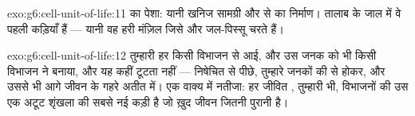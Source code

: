 \begin{solution}{exo:g6:cell-unit-of-life:11}
 का पेशा: यानी खनिज सामग्री और  से  का
 निर्माण। तालाब के जाल में वे पहली कड़ियाँ हैं --- यानी वह हरी
मंज़िल जिसे  और जल-पिस्सू चरते हैं।
\end{solution}

\begin{solution}{exo:g6:cell-unit-of-life:12}
तुम्हारी हर  किसी विभाजन से आई, और उस जनक  को भी किसी
विभाजन ने बनाया, और यह कहीं टूटता नहीं --- निषेचित  से पीछे,
तुम्हारे जनकों की  से होकर, और उससे भी आगे जीवन के गहरे अतीत
में। एक वाक्य में नतीजा: हर जीवित , तुम्हारी भी, विभाजनों की उस
एक अटूट शृंखला की सबसे नई कड़ी है जो ख़ुद जीवन जितनी पुरानी है।
\end{solution}

